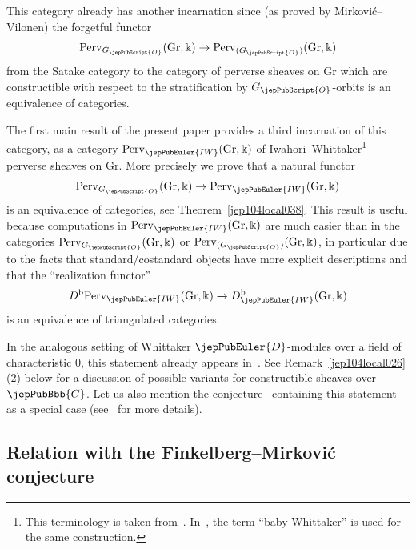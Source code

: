 This category already has another incarnation since (as proved by Mirkovi\'c--Vilonen) the forgetful functor
\[
 \mathrm{Perv}_{G_{\jepPubScript{O}}}(\mathrm{Gr},\Bbbk) \to \mathrm{Perv}_{(G_{\jepPubScript{O}})}(\mathrm{Gr},\Bbbk)
\]
from the Satake category to the category of perverse sheaves on $\mathrm{Gr}$ which are constructible with respect to the stratification by $G_{\jepPubScript{O}}$-orbits is an equivalence of categories. 

The first main result of the present paper provides a third incarnation of this category, as a category $\mathrm{Perv}_{\jepPubEuler{IW}}(\mathrm{Gr},\Bbbk)$ of Iwahori--Whittaker\footnote{This terminology is taken from~\cite{jep104ref10}. In~\cite{jep104ref09}, the term ``baby Whittaker'' is used for the same construction.} perverse sheaves on $\mathrm{Gr}$. More precisely we prove that a natural functor
\begin{equation}
\label{jep104local009}
 \mathrm{Perv}_{G_{\jepPubScript{O}}}(\mathrm{Gr},\Bbbk) \to \mathrm{Perv}_{\jepPubEuler{IW}}(\mathrm{Gr},\Bbbk)
\end{equation}
is an equivalence of categories, see Theorem~\ref{jep104local038}. This result is useful because computations in $\mathrm{Perv}_{\jepPubEuler{IW}}(\mathrm{Gr},\Bbbk)$ are much easier than in the categories $\mathrm{Perv}_{G_{\jepPubScript{O}}}(\mathrm{Gr},\Bbbk)$ or $\mathrm{Perv}_{(G_{\jepPubScript{O}})}(\mathrm{Gr},\Bbbk)$, in particular due to the facts that standard/costandard objects have more explicit descriptions and that the ``realization functor''
\[
 D^{\mathrm{b}} \mathrm{Perv}_{\jepPubEuler{IW}}(\mathrm{Gr},\Bbbk) \to D^{\mathrm{b}}_{\jepPubEuler{IW}}(\mathrm{Gr},\Bbbk)
\]
is an equivalence of triangulated categories.

In the analogous setting of Whittaker $\jepPubEuler{D}$-modules over a field of characteristic $0$, this statement already appears in~\cite{jep104ref09}. See Remark~\ref{jep104local026}(2) below for a discussion of possible variants for constructible sheaves over $\jepPubBbb{C}$. Let us also mention the conjecture~\cite[Conj.~59]{jep104ref16} containing this statement as a special case (see~\cite[Ex.~60]{jep104ref16} for more details).

\subsection{Relation with the Finkelberg--Mirkovi\'c conjecture}
\label{jep104local036}

